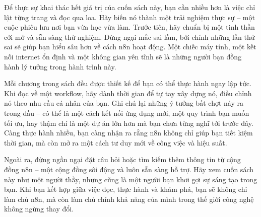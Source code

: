 \documentclass[a4paper,12pt]{book}
\begin{document}
\begin{center}
\end{center}

Để thực sự khai thác hết giá trị của cuốn sách này, bạn cần nhiều hơn là việc chỉ lật từng trang và đọc qua loa. Hãy biến nó thành một trải nghiệm thực sự – một cuộc phiêu lưu nơi bạn vừa học vừa làm. Trước tiên, hãy chuẩn bị một tinh thần cởi mở và sẵn sàng thử nghiệm. Đừng ngại mắc sai lầm, bởi chính những lần thử sai sẽ giúp bạn hiểu sâu hơn về cách n8n hoạt động. Một chiếc máy tính, một kết nối internet ổn định và một không gian yên tĩnh sẽ là những người bạn đồng hành lý tưởng trong hành trình này.

Mỗi chương trong sách đều được thiết kế để bạn có thể thực hành ngay lập tức. Khi đọc về một workflow, hãy dành thời gian để tự tay xây dựng nó, điều chỉnh nó theo nhu cầu cá nhân của bạn. Ghi chú lại những ý tưởng bất chợt nảy ra trong đầu – có thể là một cách kết nối ứng dụng mới, một quy trình bạn muốn tối ưu, hay thậm chí là một dự án lớn hơn mà bạn chưa từng nghĩ tới trước đây. Càng thực hành nhiều, bạn càng nhận ra rằng n8n không chỉ giúp bạn tiết kiệm thời gian, mà còn mở ra một cách tư duy mới về công việc và hiệu suất.

Ngoài ra, đừng ngần ngại đặt câu hỏi hoặc tìm kiếm thêm thông tin từ cộng đồng n8n – một cộng đồng sôi động và luôn sẵn sàng hỗ trợ. Hãy xem cuốn sách này như một người thầy, nhưng cũng là một người bạn khơi gợi sự sáng tạo trong bạn. Khi bạn kết hợp giữa việc đọc, thực hành và khám phá, bạn sẽ không chỉ làm chủ n8n, mà còn làm chủ chính khả năng của mình trong thế giới công nghệ không ngừng thay đổi.
\end{document}
